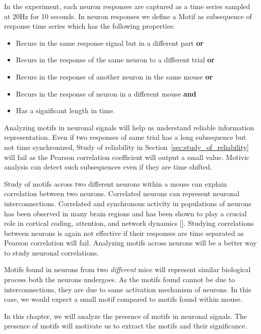 \documentclass[MTech]{iitmdiss}
\begin{document}
In the experiment, each neuron responses are captured as a time series sampled at 20Hz for 10 seconds. In neuron responses we define a Motif as subsequence of response time series which has the following properties:
\begin{itemize}
   \item Recurs in the same response signal but in a different part \textbf{or}
   \item Recurs in the response of the same neuron to a different trial \textbf{or}
   \item Recurs in the response of another neuron in the same mouse \textbf{or}
   \item Recurs in the response of neuron in a different mouse \textbf{and}
   \item Has a significant length in time.
\end{itemize}
Analyzing motifs in neuronal signals will help us understand reliable information representation. Even if two responses of same trial has a long subsequence but not time synchronized, Study of reliability in Section~\ref{sec:study_of_reliability} will fail as the Pearson correlation coefficient will output a small value. Motivic analysis can detect such subsequences even if they are time shifted.

Study of motifs across two different neurons within a mouse can explain correlation between two neurons. Correlated neurons can represent neuronal interconnections. Correlated and synchronous activity in populations of neurons has been observed in many brain regions and has been shown to play a crucial role in cortical coding, attention, and network dynamics [\cite{rosenbaum2014correlated}]. Studying correlations between neurons is again not effective if their responses are time separated as Pearson correlation will fail. Analyzing motifs across neurons will be a better way to study neuronal correlations.

Motifs found in neurons from two \textit{different} mice will represent similar biological process both the neurons undergoes. As the motifs found cannot be due to interconnections, they are due to same activation mechanism of neurons. In this case, we would expect a small motif compared to motifs found within mouse.

In this chapter, we will analyze the presence of motifs in neuronal signals. The presence of motifs will motivate us to extract the motifs and their significance.
\end{document}

